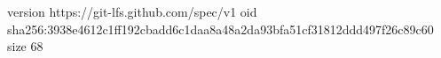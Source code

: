 version https://git-lfs.github.com/spec/v1
oid sha256:3938e4612c1ff192cbadd6c1daa8a48a2da93bfa51cf31812ddd497f26c89c60
size 68

